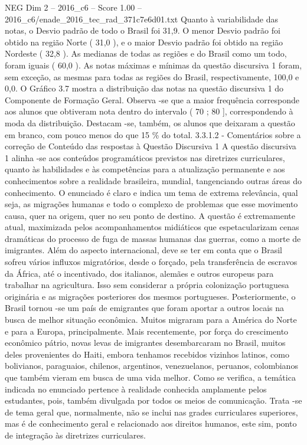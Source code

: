 \begin{textsample}{NEG Dim 2 – 2016\_c6 – Score 1.00 – 2016\_c6/enade\_2016\_tec\_rad\_371c7e6d01.txt}
Quanto à variabilidade das notas, o Desvio padrão de todo o Brasil foi 31,9.
O menor Desvio padrão foi obtido na região Norte ( 31,0 ), e o maior Desvio padrão foi obtido na região Nordeste ( 32,8 ).
As medianas de todas as regiões e do Brasil como um todo, foram iguais ( 60,0 ).
As notas máximas e mínimas da questão discursiva 1 foram, sem exceção, as mesmas para todas as regiões do Brasil, respectivamente, 100,0 e 0,0.
O Gráfico 3.7 mostra a distribuição das notas na questão discursiva 1 do Componente de Formação Geral.
Observa -se que a maior frequência corresponde aos alunos que obtiveram nota dentro do intervalo ( 70 ; 80 ], correspondendo à moda da distribuição.
Destacam -se, também, os alunos que deixaram a questão em branco, com pouco menos do que 15 \% do total. 3.3.1.2 - Comentários sobre a correção de Conteúdo das respostas à Questão Discursiva 1 A questão discursiva 1 alinha -se aos conteúdos programáticos previstos nas diretrizes curriculares, quanto às habilidades e às competências para a atualização permanente e aos conhecimentos sobre a realidade brasileira, mundial, tangenciando outras áreas do conhecimento.
O enunciado é claro e indica um tema de extrema relevância, qual seja, as migrações humanas e todo o complexo de problemas que esse movimento causa, quer na origem, quer no seu ponto de destino.
A questão é extremamente atual, maximizada pelos acompanhamentos midiáticos que espetacularizam cenas dramáticas do processo de fuga de massas humanas das guerras, como a morte de imigrantes.
Além do aspecto internacional, deve se ter em conta que o Brasil sofreu vários influxos migratórios, desde o forçado, pela transferência de escravos da África, até o incentivado, dos italianos, alemães e outros europeus para trabalhar na agricultura.
Isso sem considerar a própria colonização portuguesa originária e as migrações posteriores dos mesmos portugueses.
Posteriormente, o Brasil tornou -se um país de emigrantes que foram aportar a outros locais na busca de melhor situação econômica.
Muitos migraram para a América do Norte e para a Europa, principalmente.
Mais recentemente, por força do crescimento econômico pátrio, novas levas de imigrantes desembarcaram no Brasil, muitos deles provenientes do Haiti, embora tenhamos recebidos vizinhos latinos, como bolivianos, paraguaios, chilenos, argentinos, venezuelanos, peruanos, colombianos que também vieram em busca de uma vida melhor.
Como se verifica, a temática indicada no enunciado pertence à realidade conhecida amplamente pelos estudantes, pois, também divulgada por todos os meios de comunicação.
Trata -se de tema geral que, normalmente, não se inclui nas grades curriculares superiores, mas é de conhecimento geral e relacionado aos direitos humanos, este sim, ponto de integração às diretrizes curriculares.

\end{textsample}
